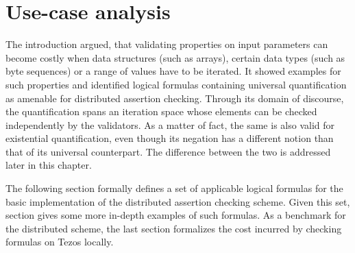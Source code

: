 \chapter{Use-case analysis}\label{chap:use_cases}
The introduction argued, that validating properties on input parameters can become costly when data structures (such as arrays), certain data types (such as byte sequences) or a range of values have to be iterated. It showed examples for such properties and identified logical formulas containing universal quantification as amenable for distributed assertion checking. Through its domain of discourse, the quantification spans an iteration space whose elements can be checked independently by the validators. As a matter of fact, the same is also valid for existential quantification, even though its negation has a different notion than that of its universal counterpart. The difference between the two is addressed later in this chapter.

The following section formally defines a set of applicable logical formulas for the basic implementation of the distributed assertion checking scheme. Given this set, section  gives some more in-depth examples of such formulas. As a benchmark for the distributed scheme, the last section formalizes the cost incurred by checking formulas on Tezos locally.

